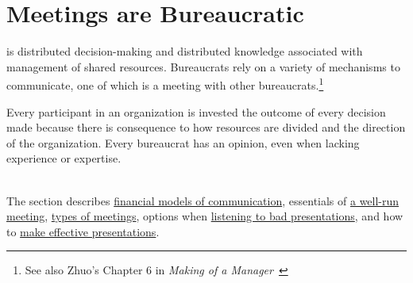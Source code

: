 \documentclass[openright]{book} %
\begin{document}
 \iftoggle{cpforsection}{\clearpage}{} %
     \iftoggle{cpforsection}{\clearpage}{} %
     \iftoggle{cpforsection}{\clearpage}{} %
     \iftoggle{cpforsection}{\clearpage}{} %
     \iftoggle{cpforsection}{\clearpage}{} %
     \iftoggle{cpforsection}{\clearpage}{} %
     \iftoggle{cpforsection}{\clearpage}{} 
    

    \section{Meetings are Bureaucratic\label{sec:meetings}}
\iftoggle{glossarysubstitutionworks}{\Gls{bureaucracy}}{Bureaucracy}
    is distributed decision-making and distributed knowledge associated with management of shared resources. Bureaucrats rely on a variety of mechanisms to communicate, one of which is a meeting with other bureaucrats.\footnote{See also Zhuo's Chapter 6 in \textit{Making of a Manager}~\cite{2019_Zhuo}} 

    Every participant in an organization is invested the outcome of every decision made because there is consequence to how resources are divided and the direction of the organization. Every bureaucrat has an opinion, even when lacking experience or expertise. 

    \ \\

    The section describes \hyperref[sec:financial-models-of-communication]{financial models of communication}, essentials of \hyperref[sec:well-run-meeting]{a well-run meeting}, \hyperref[sec:characterizing-meetings]{types of meetings}, options when \hyperref[sec:bad-presentations]{listening to bad presentations}, and how to \hyperref[sec:effective-presentations]{make effective presentations}.

        
         
         
         
        
        
\end{document}

